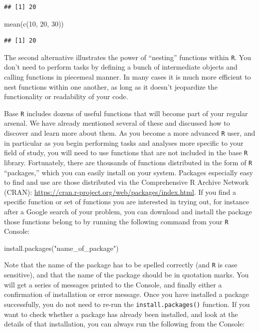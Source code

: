 \documentclass[
]{book}
\newenvironment{Shaded}{\begin{snugshade}}{\end{snugshade}}
\newcommand{\DecValTok}[1]{\textcolor[rgb]{0.00,0.00,0.81}{#1}}
\newcommand{\FunctionTok}[1]{\textcolor[rgb]{0.00,0.00,0.00}{#1}}
\newcommand{\NormalTok}[1]{#1}
\newcommand{\StringTok}[1]{\textcolor[rgb]{0.31,0.60,0.02}{#1}}
\begin{document}
\begin{verbatim}
## [1] 20
\end{verbatim}

\begin{Shaded}
\begin{Highlighting}[]
\FunctionTok{mean}\NormalTok{(}\FunctionTok{c}\NormalTok{(}\DecValTok{10}\NormalTok{, }\DecValTok{20}\NormalTok{, }\DecValTok{30}\NormalTok{))}
\end{Highlighting}
\end{Shaded}

\begin{verbatim}
## [1] 20
\end{verbatim}

The second alternative illustrates the power of ``nesting'' functions within \texttt{R}. You don't need to perform tasks by defining a bunch of intermediate objects and calling functions in piecemeal manner. In many cases it is much more efficient to nest functions within one another, as long as it doesn't jeopardize the functionality or readability of your code.

Base \texttt{R} includes dozens of useful functions that will become part of your regular arsenal. We have already mentioned several of these and discussed how to discover and learn more about them. As you become a more advanced \texttt{R} user, and in particular as you begin performing tasks and analyses more specific to your field of study, you will need to use functions that are not included in the base \texttt{R} library. Fortunately, there are thousands of functions distributed in the form of \texttt{R} ``packages,'' which you can easily install on your system. Packages especially easy to find and use are those distributed via the Comprehensive R Archive Network (CRAN): \url{https://cran.r-project.org/web/packages/index.html}. If you find a specific function or set of functions you are interested in trying out, for instance after a Google search of your problem, you can download and install the package those functions belong to by running the following command from your \texttt{R} Console:

\begin{Shaded}
\begin{Highlighting}[]
\FunctionTok{install.packages}\NormalTok{(}\StringTok{"name\_of\_package"}\NormalTok{)}
\end{Highlighting}
\end{Shaded}

Note that the name of the package has to be spelled correctly (and \texttt{R} is case sensitive), and that the name of the package should be in quotation marks. You will get a series of messages printed to the Console, and finally either a confirmation of installation or error message. Once you have installed a package successfully, you do not need to re-run the \texttt{install.packages()} function. If you want to check whether a package has already been installed, and look at the details of that installation, you can always run the following from the Console:
\end{document}
